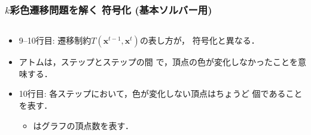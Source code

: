 \begin{frame}[shrink]
  \frametitle{$k$彩色遷移問題を解く 符号化 {\small(基本ソルバー用)}}

\begin{columns}[t]
\begin{column}{0.9\linewidth}
\begin{exampleblock}{}
 
\end{exampleblock}    
\end{column}
\end{columns}

\begin{itemize}
  \item 9--10行目: 遷移制約$T(\bm{x}^{t-1},\bm{x}^{t})$の表し方が，
    符号化と異なる．
  \item アトムは，ステップとステップの間
    で，頂点の色が変化しなかったことを意味する．
  \item 10行目: 各ステップにおいて，色が変化しない頂点はちょうど
    個であることを表す．
    \begin{itemize}
      \item {}はグラフの頂点数を表す．
    \end{itemize}
\end{itemize}

\end{frame}
